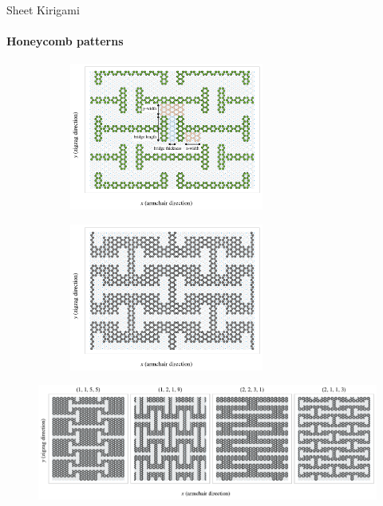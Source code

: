 \documentclass[
	10pt, %
]{beamer}
\begin{document}
%
%
\begin{frame}{Sheet Kirigami}
	\framesubtitle{Honeycomb patterns}

	\begin{figure}[H]
		\centering
		\begin{subfigure}[t]{0.48\textwidth}
			\centering
			\raggedleft
			\includegraphics[width=0.7\textwidth]{../thesis/figures/system/honeycomb_inverse.pdf}
		  \end{subfigure}
		  \hfill
		  \begin{subfigure}[t]{0.48\textwidth}
			\centering
			\raggedright
			\includegraphics[width=0.7\textwidth]{../thesis/figures/system/honeycomb_pattern.pdf}
		\end{subfigure}
	  \end{figure}
	  
	  
	  \begin{figure}[H]
		\centering
		\includegraphics[trim={0 0 0 8mm},clip,width=\linewidth]{../thesis/figures/system/honeycomb_flavors.pdf}
	  \end{figure}
\end{frame}
\end{document}
